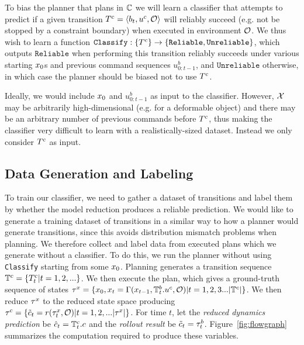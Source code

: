  To bias the planner that plans in $\mathbb{C}$ we will learn a classifier that attempts to predict if a given transition $T^c = \left<b_t,u^c,\mathcal{O}\right>$ will reliably succeed (e.g. not be stopped by a constraint boundary) when executed in environment $\mathcal{O}$. We thus wish to learn a function 
$\texttt{Classify}:\{T^c\} \rightarrow \left\{\texttt{Reliable},\texttt{Unreliable}\right\}$, which outputs $\texttt{Reliable}$ when performing this transition reliably succeeds under various starting $x_0$s and previous command sequences $u^b_{0:t-1}$, and $\texttt{Unreliable}$ otherwise, in which case the planner should be biased not to use $T^c$.

Ideally, we would include $x_0$ and $u^b_{0:t-1}$ as input to the classifier. However, $\mathcal{X}$ may be arbitrarily high-dimensional (e.g. for a deformable object) and there may be an arbitrary number of previous commands before $T^c$, thus making the classifier very difficult to learn with a realistically-sized dataset. Instead we only consider $T^c$ as input.


\subsection{Data Generation and Labeling}


To train our classifier, we need to gather a dataset of transitions and label them by whether the model reduction produces a reliable prediction. We would like to generate a training dataset of transitions in a similar way to how a planner would generate transitions, since this avoids distribution mismatch problems when planning. We therefore collect and label data from executed plans which we generate without a classifier. To do this, we run the planner without using \texttt{Classify} starting from some $x_0$. Planning generates a transition sequence $\mathbb{T}^c = \{T_t^c | t=1,2,...\}$. We then execute the plan, which gives a ground-truth sequence of states $\tau^x = \{x_0, x_t = \Gamma(x_{t-1},\mathbb{T}^b_t.u^c,\mathcal{O}) | t=1,2,3...|\mathbb{T}^c|\}$. We then reduce $\tau^x$ to the reduced state space producing $\tau^c = \{\tilde{c}_t=r(\tau^x_t,\mathcal{O})|t=1,2,...|\tau^x|\}$. For time $t$, let the \textit{reduced dynamics prediction} be $\hat{c}_t = \mathbb{T}^c_t.c$ and the \textit{rollout result} be $\tilde{c}_t = \tau^b_t$. Figure~\ref{fig:flowgraph} summarizes the computation required to produce these variables.



